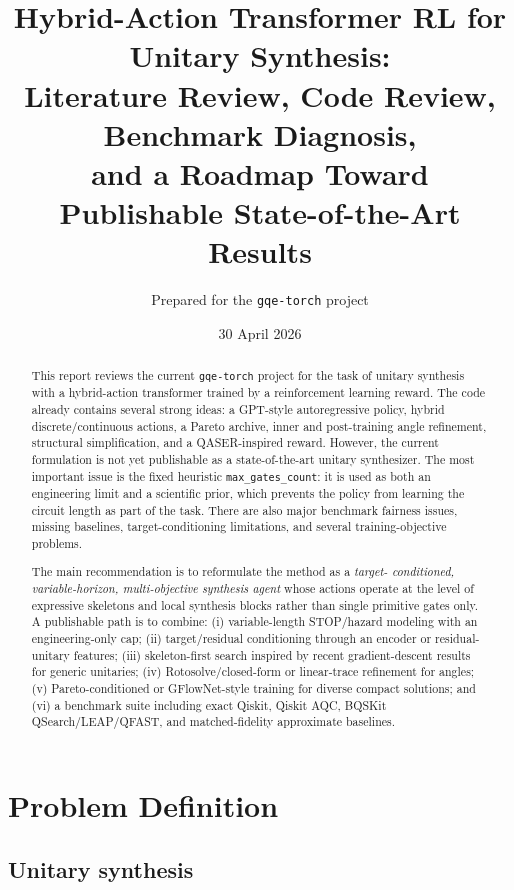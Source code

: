 \documentclass[11pt,a4paper]{article}
\title{\textbf{Hybrid-Action Transformer RL for Unitary Synthesis:\\
Literature Review, Code Review, Benchmark Diagnosis,\\
and a Roadmap Toward Publishable State-of-the-Art Results}}
\author{Prepared for the \texttt{gqe-torch} project}
\date{30 April 2026}
\begin{document}
\maketitle

\begin{abstract}
This report reviews the current \texttt{gqe-torch} project for the task of
unitary synthesis with a hybrid-action transformer trained by a reinforcement
learning reward. The code already contains several strong ideas: a GPT-style
autoregressive policy, hybrid discrete/continuous actions, a Pareto archive,
inner and post-training angle refinement, structural simplification, and a
QASER-inspired reward. However, the current formulation is not yet publishable
as a state-of-the-art unitary synthesizer. The most important issue is the
fixed heuristic \texttt{max\_gates\_count}: it is used as both an engineering
limit and a scientific prior, which prevents the policy from learning the
circuit length as part of the task. There are also major benchmark fairness
issues, missing baselines, target-conditioning limitations, and several
training-objective problems.

The main recommendation is to reformulate the method as a \emph{target-
conditioned, variable-horizon, multi-objective synthesis agent} whose actions
operate at the level of expressive skeletons and local synthesis blocks rather
than single primitive gates only. A publishable path is to combine: (i)
variable-length STOP/hazard modeling with an engineering-only cap; (ii)
target/residual conditioning through an encoder or residual-unitary features;
(iii) skeleton-first search inspired by recent gradient-descent results for
generic unitaries; (iv) Rotosolve/closed-form or linear-trace refinement for
angles; (v) Pareto-conditioned or GFlowNet-style training for diverse compact
solutions; and (vi) a benchmark suite including exact Qiskit, Qiskit AQC,
BQSKit QSearch/LEAP/QFAST, and matched-fidelity approximate baselines.
\end{abstract}

\tableofcontents
\newpage

\section{Problem Definition}

\subsection{Unitary synthesis}
\end{document}
